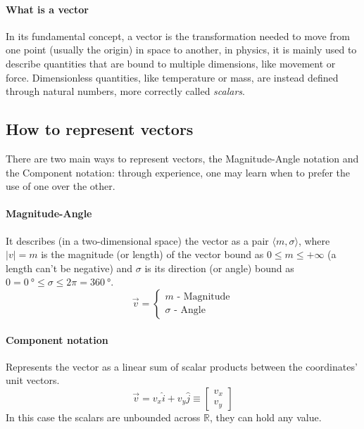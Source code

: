 \paragraph{What is a vector} In its fundamental concept, a vector is the transformation needed to move from one point (usually the origin) in space to another, in physics, it is mainly used to describe quantities that are bound to multiple dimensions, like movement or force. Dimensionless quantities, like temperature or mass, are instead defined through natural numbers, more correctly called \emph{scalars}.
\subsection{How to represent vectors} There are two main ways to represent vectors, the Magnitude-Angle notation and the Component notation: through experience, one may learn when to prefer the use of one over the other.
\paragraph{Magnitude-Angle} It describes (in a two-dimensional space) the vector as a pair $\langle m, \sigma\rangle$, where $|v|=m$ is the magnitude (or length) of the vector bound as $0\le m \le +\infty$ (a length can't be negative) and $\sigma$ is its direction (or angle) bound as $0=\SI{0}{\degree}\le \sigma \le 2\pi = \SI{360}{\degree}$.
\begin{equation}
    \vec{v} =\begin{cases}
        m \mbox{ - Magnitude}\\ %
        \sigma \mbox{ - Angle}  %
    \end{cases}                 %
\end{equation}
\paragraph{Component notation} Represents the vector as a linear sum of scalar products between the coordinates' unit vectors.
\begin{equation}
    \vec{v} = v_x \hat{i} + v_y \hat{j}\equiv \begin{bmatrix}   
        v_x\\ v_y
    \end{bmatrix} %
\end{equation}
In this case the scalars are unbounded across $\mathbb{R}$, they can hold any value.
